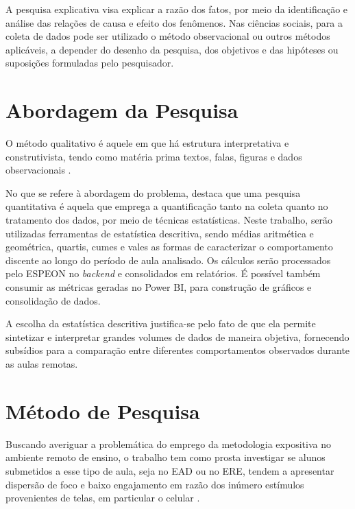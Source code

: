 \begin{customquote}
    A pesquisa explicativa visa explicar a razão dos fatos, por meio da identificação e
    análise das relações de causa e efeito dos fenômenos. Nas ciências sociais, para a coleta de
    dados pode ser utilizado o método observacional ou outros métodos aplicáveis, a depender do
    desenho da pesquisa, dos objetivos e das hipóteses ou suposições formuladas pelo pesquisador.
    \cite{sienaMetodologiaPesquisaCientifica2024}
\end{customquote}

\section{Abordagem da Pesquisa}\label{sec:research_approach}
O método qualitativo é aquele em que há estrutura interpretativa e construtivista, tendo como matéria prima textos, falas, figuras e dados observacionais \cite{sienaMetodologiaPesquisaCientifica2024}.

No que se refere à abordagem do problema,  destaca que uma pesquisa quantitativa é aquela que emprega a quantificação tanto na coleta quanto no tratamento dos dados, por meio de técnicas estatísticas.  Neste trabalho, serão utilizadas ferramentas de estatística descritiva, sendo médias aritmética e geométrica, quartis, cumes e vales as formas de caracterizar o comportamento discente ao longo do período de aula analisado. Os cálculos serão processados pelo ESPEON no \textit{backend} e consolidados em relatórios. É possível também consumir as métricas geradas no Power BI, para construção de gráficos e consolidação de dados.

A escolha da estatística descritiva justifica-se pelo fato de que ela permite sintetizar e interpretar grandes volumes de dados de maneira objetiva, fornecendo subsídios para a comparação entre diferentes comportamentos observados durante as aulas remotas.

\section{Método de Pesquisa}\label{sec:research_method}
Buscando averiguar a problemática do emprego da metodologia expositiva no ambiente remoto de ensino, o trabalho tem como prosta investigar se alunos submetidos a esse tipo de aula, seja no EAD ou no ERE, tendem a apresentar dispersão de foco e baixo engajamento em razão dos inúmero estímulos provenientes de telas, em particular o celular \cite{lopesUsoCelularEm2017}.

